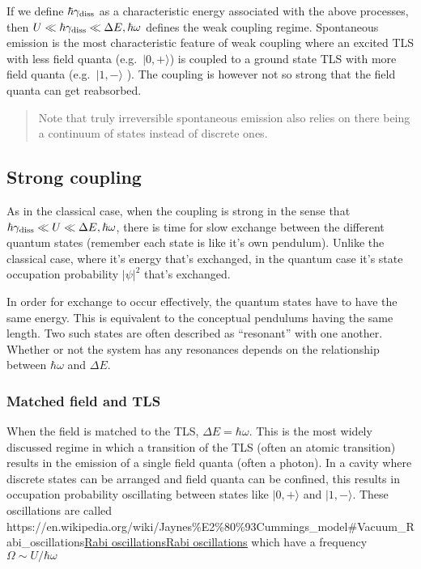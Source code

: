 \documentclass[
]{article}
\let\oldhref\href
\renewcommand{\href}[2]{\ifx#1\urlprefix\oldhref{#1}{#2}\else\uline{\oldhref{#1}{#2}}\fi}
\renewcommand{\[}{\begin{equation}}
\renewcommand{\]}{\end{equation}}
\begin{document}
If we define \(\hbar\gamma_{\rm diss}\) as a characteristic energy
associated with the above processes, then
\(U \ll \hbar \gamma_{\rm diss} \ll \Delta E , \hbar \omega\) defines
the weak coupling regime. Spontaneous emission is the most
characteristic feature of weak coupling where an excited TLS with less
field quanta (e.g.~\(|0,+\rangle\)) is coupled to a ground state TLS
with more field quanta (e.g.~\(|1,-\rangle\) ). The coupling is however
not so strong that the field quanta can get reabsorbed.

\begin{quote}
Note that truly irreversible spontaneous emission also relies on there
being a continuum of states instead of discrete ones.
\end{quote}

\subsection{Strong coupling}\label{strong-coupling-1}

As in the classical case, when the coupling is strong in the sense that
\(\hbar\gamma_{\rm diss} \ll U \ll \Delta E , \hbar \omega\), there is
time for slow exchange between the different quantum states (remember
each state is like it's own pendulum). Unlike the classical case, where
it's energy that's exchanged, in the quantum case it's state occupation
probability \(|\psi|^2\) that's exchanged.

In order for exchange to occur effectively, the quantum states have to
have the same energy. This is equivalent to the conceptual pendulums
having the same length. Two such states are often described as
``resonant'' with one another. Whether or not the system has any
resonances depends on the relationship between \(\hbar \omega\) and
\(\Delta E\).

\subsubsection{Matched field and TLS}\label{matched-field-and-tls}

When the field is matched to the TLS, \(\Delta E = \hbar\omega\). This
is the most widely discussed regime in which a transition of the TLS
(often an atomic transition) results in the emission of a single field
quanta (often a photon). In a cavity where discrete states can be
arranged and field quanta can be confined, this results in occupation
probability oscillating between states like \(|0,+\rangle\) and
\(|1,-\rangle\). These oscillations are called
\href{https://en.wikipedia.org/wiki/Jaynes\%E2\%80\%93Cummings_model\#Vacuum_Rabi_oscillations}{Rabi
oscillations} which have a frequency \(\Omega \sim U/\hbar\omega\)
\end{document}
